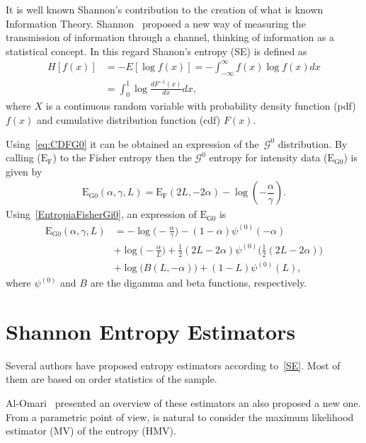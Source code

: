 \documentclass[journal]{IEEEtran}
\begin{document}
It is well known Shannon's contribution to the creation of what is known Information Theory. 
Shannon~\cite{Shannon1948} proposed a new way of
measuring the transmission of information through a channel, thinking of information as a statistical concept. 
In this regard Shanon's entropy (SE) is defined as
\begin{align}
	\label{SE}
	H[f(x)]&=-E[\log f(x)]=-\int_{-\infty}^{\infty} f(x) \log f(x) d x\\
	       &= \int_{0}^{1} \log \frac{d F^{-1}(x)}{d x} d x,
\end{align}
where $X$ is a continuous random variable with probability density function (pdf) $f(x)$ and
cumulative distribution function (cdf) $F(x)$. 

Using~\eqref{eq:CDFG0} it can be obtained an expression of the~$\mathcal{G}^0$ distribution. By calling ($\text{E}_{\text{F}}$) to the Fisher entropy then the $\mathcal{G}^0$ entropy for intensity data ($\text{E}_{\text{G0}}$) is given by
\begin{align}
	\label{EntropiaFisherGi0}
	\text{E}_{\text{G0}}(\alpha,\gamma,L)=\text{E}_{\text{F}}(2 L, - 2 \alpha) -\log(-\dfrac{\alpha}{\gamma}).
\end{align}
Using~\eqref{EntropiaFisherGi0}, an 
expression of $\text{E}_{\text{G0}}$ is
\begin{align}
	\label{EG0}
	\text{E}_{\text{G0}}(\alpha,\gamma,L)&=-\log \Big(-\frac{\alpha }{\gamma }\Big)-(1-\alpha ) \psi^{(0)}(-\alpha )\\ \nonumber
	&+\log \Big(-\frac{\alpha }{L}\Big)+\frac{1}{2} (2 L-2 \alpha ) \psi ^{(0)}\Big(\frac{1}{2} (2 L-2 \alpha )\Big)\\ \nonumber
	&+\log \big(B(L,-\alpha )\big)+(1-L) \psi^{(0)}(L),
\end{align}
where $\psi^{(0)}$ and $B$ are the digamma and beta functions, respectively.

\section{Shannon Entropy Estimators}

Several authors have proposed entropy estimators according to~\eqref{SE}.
Most of them are based on order statistics of the sample. 

Al-Omari~\cite{AlOmari2013} presented an overview of these estimators an also proposed a new one. 
From a parametric point of view, is natural to consider the maximum likelihood estimator (MV) of the entropy (HMV).
\end{document}
